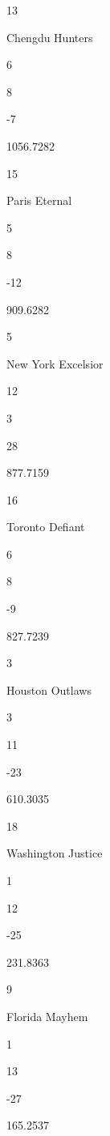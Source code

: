 \documentclass[]{article}
\begin{document}
13

Chengdu Hunters

6

8

{-7}

{1056.7282}

15

Paris Eternal

5

8

{-12}

{909.6282}

5

New York Excelsior

12

3

{28}

{877.7159}

16

Toronto Defiant

6

8

{-9}

{827.7239}

3

Houston Outlaws

3

11

{-23}

{610.3035}

18

Washington Justice

1

12

{-25}

{231.8363}

9

Florida Mayhem

1

13

{-27}

{165.2537}
\end{document}
